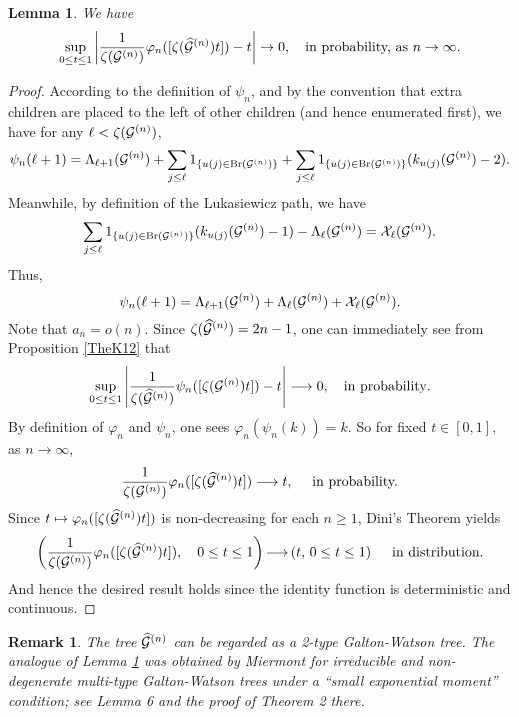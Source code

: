 \documentclass[11pt,a4paper]{article}
\newtheorem{lm}[prop]{Lemma}
\newtheorem{rem}[prop]{Remark}
\newcommand{\cG}{\mathcal{G}}
\begin{document}
\begin{lm}
\label{lemTime} We have
$$\sup_{0\leq t\leq 1}\left|\frac{1}{\zeta({\cal G}^{(n)} )}\varphi_n([\zeta(\widehat{{\cal G}}^{(n)} ) t ])-t\right|\rightarrow0,\quad \text{in probability, as }n\rightarrow\infty.$$
\end{lm}
\begin{proof}
According to the definition of $\psi_n$, and by the convention that extra children are placed to the left of other children (and hence enumerated first), we have for any $\ell<\zeta({\cal G}^{(n)} )$,
$$
\psi_n(\ell+1)=\Lambda_{\ell+1} ({\cal G}^{(n)} )+\sum_{j\leq \ell}1_{\{u(j)\in {\rm Br}({\cal G}^{(n)} )\}}+\sum_{j\leq \ell}1_{\{u(j)\in {\rm Br}({\cal G}^{(n)} )\}}(k_{u(j)}(\cG^{(n)})-2).
$$
Meanwhile, by definition of the Lukasiewicz path, we have 
$$
\sum_{j\leq \ell}1_{\{u(j)\in {\rm Br}({\cal G}^{(n)} )\}}(k_{u(j)}(\cG^{(n)})-1)- \Lambda_{\ell} ({\cal G}^{(n)} )={\cal X}_{\ell}({\cal G}^{(n)} ).
$$
Thus,
$$
\psi_n(\ell+1)= \Lambda_{\ell+1}({\cal G}^{(n)} )+ \Lambda_{\ell}({\cal G}^{(n)} )+{\cal X}_{\ell}({\cal G}^{(n)} ).
$$
Note that $a_n=o(n)$. Since $\zeta(\widehat{{\cal G}}^{(n)} )=2n-1$, one can immediately see from Proposition \ref{TheK12} that
$$\sup_{0\leq t\leq 1}\left|\frac{1}{\zeta(\widehat{{\cal G}}^{(n)} )}\psi_n([\zeta({\cal G}^{(n)} ) t ])-t\right|\longrightarrow0,\quad \text{in probability}.$$
By definition of $\varphi_n$ and $\psi_n$, one sees $\varphi_n(\psi_n(k))=k$.  So for fixed $ t\in [0, 1]$, as $ n\rightarrow \infty$,
$$\frac{1}{\zeta({\cal G}^{(n)} )}\varphi_n([\zeta(\widehat{{\cal G}}^{(n)} ) t ])\longrightarrow t,\quad\text{ in probability.}$$
Since $t\mapsto  \varphi_n([\zeta(\widehat{{\cal G}}^{(n)} ) t ])$ is non-decreasing for each $n \geq 1$, Dini's Theorem yields 
$$\left(\frac{1}{\zeta({\cal G}^{(n)} )}\varphi_n([\zeta(\widehat{{\cal G}}^{(n)} ) t ]),\quad 0\leq t\leq 1\right) {\longrightarrow} \left(t,\, 0\leq t\leq 1\right)\quad\text{ in distribution}.$$
 And hence the desired result holds since the identity function is deterministic and continuous. \end{proof}
\begin{rem}\rm
The tree $\widehat{\cal G}^{(n)}$ can be regarded as a 2-type Galton-Watson tree. The analogue of Lemma \ref{lemTime} was obtained by Miermont \cite{Mie08}  for irreducible and non-degenerate multi-type Galton-Watson trees  under a ``small exponential moment'' condition; see Lemma 6 and the proof of Theorem 2 there.
\end{rem}
\end{document}
